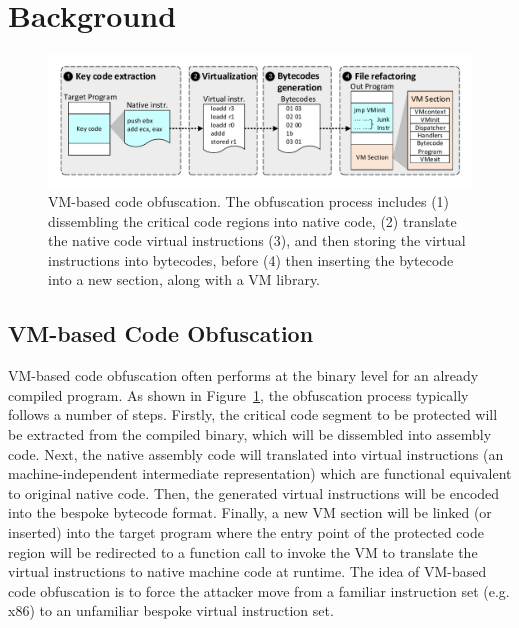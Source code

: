 \section{Background}\label{sec:bak}

\begin{figure}[t]%
    \centering
    \includegraphics[width=1\columnwidth]{figure/figvmp.pdf}
    \caption{VM-based code obfuscation. The obfuscation process includes (1) dissembling the critical code regions into native code, (2) translate the native code virtual instructions (3), and then storing the virtual instructions into bytecodes, before (4) then inserting the bytecode into a new section, along with a VM library.}\label{fig:Fig.vmp}
\end{figure}

\subsection{VM-based Code Obfuscation}
VM-based code obfuscation often performs at the binary level for an already
compiled program. As shown in Figure~\ref{fig:Fig.vmp}, the obfuscation
process typically follows a number of steps. Firstly, the critical code
segment to be protected will be extracted from the compiled binary, which
will be dissembled into assembly code. Next, the native assembly code will
translated into virtual instructions (an machine-independent intermediate
representation) which are functional equivalent to original native code.
Then, the generated virtual instructions will be encoded into the bespoke
bytecode format.  Finally, a new VM section will be linked (or inserted) into
the target program where the entry point of the protected code region will be
redirected to a function call to invoke the VM to translate the virtual
instructions to native machine code at runtime. The idea of VM-based code
obfuscation is to force the attacker move from a familiar
instruction set (e.g. x86) to an unfamiliar bespoke virtual instruction set.


